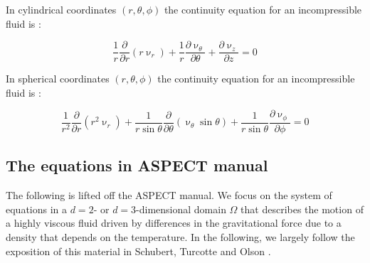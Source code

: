 In cylindrical coordinates $(r,\theta,\phi)$ 
the continuity equation for an incompressible fluid is :

\begin{mdframed}[backgroundcolor=blue!5]
\[
\frac{1}{r} \frac{\partial}{\partial r} (r \upnu_r) 
+
\frac{1}{r} \frac{\partial \upnu_\theta}{\partial \theta}
+
\frac{\partial \upnu_z}{\partial z}=0
\]
\end{mdframed}


In spherical coordinates $(r,\theta,\phi)$ 
the continuity equation for an incompressible fluid is :

\begin{mdframed}[backgroundcolor=blue!5]
\[
\frac{1}{r^2} \frac{\partial}{\partial r} (r^2 \upnu_r) 
+
\frac{1}{r \sin\theta} \frac{\partial}{\partial \theta} (\upnu_\theta \sin\theta)
+
\frac{1}{r \sin\theta} \frac{\partial \upnu_\phi}{\partial \phi}=0
\]
\end{mdframed}



\subsection{The equations in ASPECT manual}
The following is lifted off the ASPECT manual.
We focus on the system of equations in a $d=2$- or $d=3$-dimensional
domain $\Omega$ that describes the motion of a highly viscous fluid driven
by differences in the gravitational force due to a density that depends on
the temperature. In the following, we largely follow the exposition of this
material in Schubert, Turcotte and Olson \cite{scto01}.

